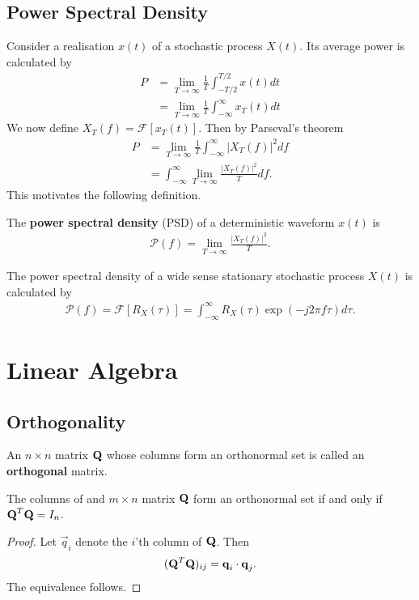 \documentclass{memoir}
\newcommand{\F}{\mathcal{F}}
\begin{document}
\section{Power Spectral Density}
Consider a realisation $x(t)$ of a stochastic process $X(t)$. Its average power is calculated by
\begin{align*}
    P &= \lim_{T \to \infty} \frac{1}{T} \int_{-T/2}^{T/2} x(t) dt \\
    &= \lim_{T \to \infty} \frac{1}{T} \int_{-\infty}^{\infty} x_T(t) dt
\end{align*}
We now define $X_T(f) = \F[x_T(t)]$. Then by Parseval's theorem
\begin{align*}
    P &= \lim_{T \to \infty} \frac{1}{T} \int_{-\infty}^{\infty} |X_T(f)|^2 df \\
    &= \int_{-\infty}^{\infty} \lim_{T \to \infty} \frac{|X_T(f)|^2}{T} df.
\end{align*}
This motivates the following definition.
\begin{definition}
    The \textbf{power spectral density} (PSD) of a deterministic waveform $x(t)$ is 
    \begin{align*}
        \mathcal{P}(f) = \lim_{T \to \infty} \frac{|X_T(f)|^2}{T}.
    \end{align*}
\end{definition}

\begin{theorem}
    The power spectral density of a wide sense stationary stochastic process $X(t)$ is calculated by
    \begin{align*}
        \mathcal{P}(f) = \F[R_X(\tau)] = \int_{-\infty}^{\infty} R_X(\tau) \exp(-j2\pi f \tau) d \tau.
    \end{align*}
\end{theorem}

\chapter{Linear Algebra}
\section{Orthogonality}
\begin{definition}
    An $n \times n$ matrix $\boldsymbol{\mathbf{Q}}$ whose columns form an orthonormal set is called an \textbf{orthogonal} matrix.
\end{definition}

\begin{theorem}
    The columns of and $m \times n$ matrix $\boldsymbol{\mathbf{Q}}$ form an orthonormal set if and only if $\boldsymbol{\mathbf{Q}}^T \boldsymbol{\mathbf{Q}}=I_n$.
\end{theorem}
\begin{proof}
    Let $\vec{q}_i$ denote the $i$'th column of $\boldsymbol{\mathbf{Q}}$. Then
    \begin{align*}
        (\boldsymbol{\mathbf{Q}}^T \boldsymbol{\mathbf{Q}})_{ij} = \boldsymbol{\mathbf{q}}_i \cdot \boldsymbol{\mathbf{q}}_j.
    \end{align*}
    The equivalence follows.
\end{proof}
\end{document}
